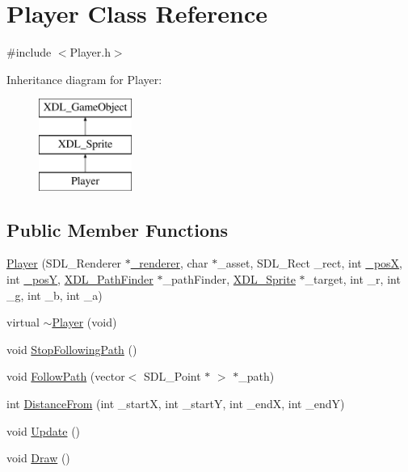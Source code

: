 \hypertarget{class_player}{\section{Player Class Reference}
\label{class_player}
}


{\ttfamily \#include $<$Player.\-h$>$}

Inheritance diagram for Player\-:\begin{figure}[H]
\begin{center}
\leavevmode
\includegraphics[height=3.000000cm]{class_player}
\end{center}
\end{figure}
\subsection*{Public Member Functions}
\begin{DoxyCompactItemize}
\item 
\hyperlink{class_player_a6441995ccc3600a6d8351abbbb5968e2}{Player} (S\-D\-L\-\_\-\-Renderer $\ast$\hyperlink{class_x_d_l___sprite_aedcf07ef73df095eb6cd9843870cd002}{\-\_\-renderer}, char $\ast$\-\_\-asset, S\-D\-L\-\_\-\-Rect \-\_\-rect, int \hyperlink{class_x_d_l___sprite_ac7671bf39741642f55368690a562fff8}{\-\_\-pos\-X}, int \hyperlink{class_x_d_l___sprite_a2e69aab364da9c9e16ae398838679065}{\-\_\-pos\-Y}, \hyperlink{class_x_d_l___path_finder}{X\-D\-L\-\_\-\-Path\-Finder} $\ast$\-\_\-path\-Finder, \hyperlink{class_x_d_l___sprite}{X\-D\-L\-\_\-\-Sprite} $\ast$\-\_\-target, int \-\_\-r, int \-\_\-g, int \-\_\-b, int \-\_\-a)
\item 
virtual \hyperlink{class_player_a949762ad57300f070d83ec877ec6e907}{$\sim$\-Player} (void)
\item 
void \hyperlink{class_player_a456327628e5ee73666add176752b36fe}{Stop\-Following\-Path} ()
\item 
void \hyperlink{class_player_a7a8ac5183d635f6f49cc1bdf285953c2}{Follow\-Path} (vector$<$ S\-D\-L\-\_\-\-Point $\ast$ $>$ $\ast$\-\_\-path)
\item 
int \hyperlink{class_player_ac7e6dc6806a9f5ddae4f5a015f8cac27}{Distance\-From} (int \-\_\-start\-X, int \-\_\-start\-Y, int \-\_\-end\-X, int \-\_\-end\-Y)
\item 
void \hyperlink{class_player_a05b60cac1922c5be5c1be16baffa4497}{Update} ()
\item 
void \hyperlink{class_player_a00ae3ebe88af8f9cfabd819176516a73}{Draw} ()
\end{DoxyCompactItemize}

